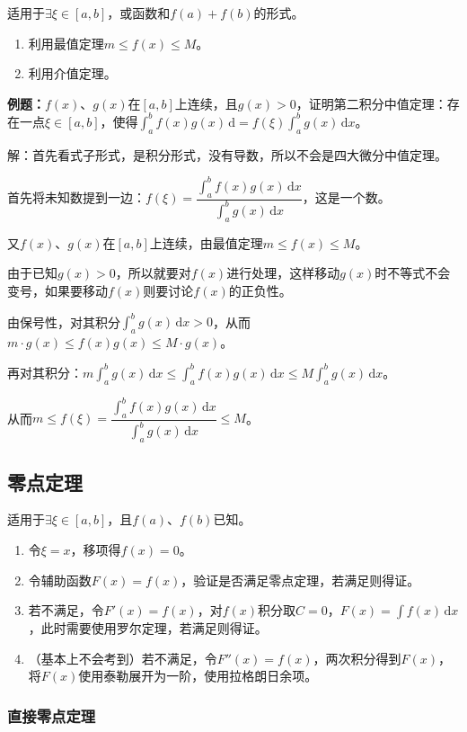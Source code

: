 \documentclass[UTF8, 12pt]{ctexart}
\begin{document}
适用于$\exists\xi\in[a,b]$，或函数和$f(a)+f(b)$的形式。

\begin{enumerate}
    \item 利用最值定理$m\leqslant f(x)\leqslant M$。
    \item 利用介值定理。
\end{enumerate}

\textbf{例题：}$f(x)$、$g(x)$在$[a,b]$上连续，且$g(x)>0$，证明第二积分中值定理：存在一点$\xi\in[a,b]$，使得$\int_a^bf(x)g(x)\,\textrm{d}=f(\xi)\int_a^bg(x)\,\textrm{d}x$。

解：首先看式子形式，是积分形式，没有导数，所以不会是四大微分中值定理。

首先将未知数提到一边：$f(\xi)=\dfrac{\int_a^bf(x)g(x)\,\textrm{d}x}{\int_a^bg(x)\,\textrm{d}x}$，这是一个数。

又$f(x)$、$g(x)$在$[a,b]$上连续，由最值定理$m\leqslant f(x)\leqslant M$。

由于已知$g(x)>0$，所以就要对$f(x)$进行处理，这样移动$g(x)$时不等式不会变号，如果要移动$f(x)$则要讨论$f(x)$的正负性。

由保号性，对其积分$\int_a^bg(x)\,\textrm{d}x>0$，从而$m\cdot g(x)\leqslant f(x)g(x)\leqslant M\cdot g(x)$。

再对其积分：$m\int_a^bg(x)\,\textrm{d}x\leqslant\int_a^bf(x)g(x)\,\textrm{d}x\leqslant M\int_a^bg(x)\,\textrm{d}x$。

从而$m\leqslant f(\xi)=\dfrac{\int_a^bf(x)g(x)\,\textrm{d}x}{\int_a^bg(x)\,\textrm{d}x}\leqslant M$。

\subsection{零点定理}

适用于$\exists\xi\in[a,b]$，且$f(a)$、$f(b)$已知。

\begin{enumerate}
    \item 令$\xi=x$，移项得$f(x)=0$。
    \item 令辅助函数$F(x)=f(x)$，验证是否满足零点定理，若满足则得证。
    \item 若不满足，令$F'(x)=f(x)$，对$f(x)$积分取$C=0$，$F(x)=\int f(x)\,\textrm{d}x$，此时需要使用罗尔定理，若满足则得证。
    \item （基本上不会考到）若不满足，令$F''(x)=f(x)$，两次积分得到$F(x)$，将$F(x)$使用泰勒展开为一阶，使用拉格朗日余项。
\end{enumerate}

\subsubsection{直接零点定理}
\end{document}

